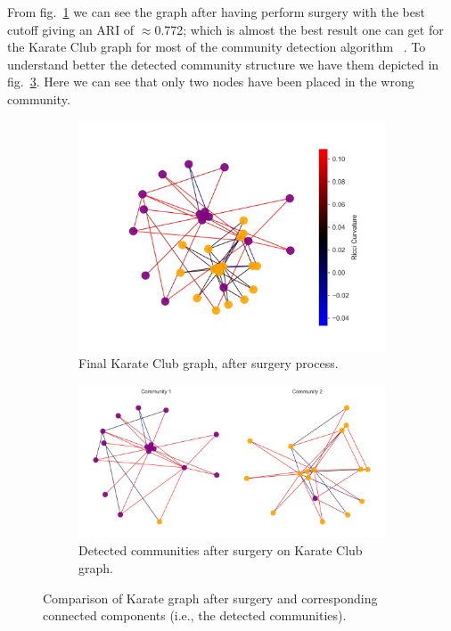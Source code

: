 From fig.~\ref{fig:Karate_Communities_a} we can see the graph after having perform surgery with the best cutoff giving an ARI of $\approx$0.772; which is almost the best result one can get for the Karate Club graph for most of the community detection algorithm ~\cite{Ni:communitydetectionnetworksricci}. To understand better the detected community structure we have them depicted in fig.~\ref{fig:Karate_Communities_b}. Here we can see that only two nodes have been placed in the wrong community.
\begin{figure}
    \centering
    \begin{subfigure}{0.45\textwidth}
        \centering
        \includegraphics[width=\textwidth]{../KarateClubResults/After Surgery.png}
        \caption{Final Karate Club graph, after surgery process.}
        \label{fig:Karate_Communities_a}
    \end{subfigure}
    \hfill
    \begin{subfigure}{0.45\textwidth}
        \centering
        \includegraphics[width=\textwidth]{../KarateClubResults/Detected Communities.png}
        \caption{Detected communities after surgery on Karate Club graph.}
        \label{fig:Karate_Communities_b}
    \end{subfigure}
    \caption{Comparison of Karate graph after surgery and corresponding connected components (i.e., the detected communities).}
\end{figure}

